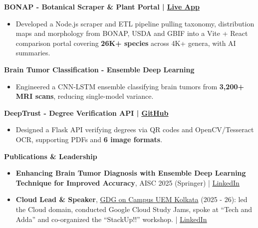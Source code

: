 \documentclass[10pt,a4paper]{article}
\newcommand{\heading}[1]{{\carlito #1}}
\newcommand{\cvsection}[1]{%
  \par\vspace{10pt}%
  {\heading{\color{sectioncolor}\large\bfseries #1}}\par\vspace{2pt}}
\newcommand{\cvsubsection}[1]{%
  \par\vspace{5pt}%
  {\heading{\color{subcolor}\bfseries #1}}\par}
\newenvironment{cvbullets}{\begin{itemize}\setlength{\parfillskip}{0pt}}{\end{itemize}}
\newcommand{\contactlink}[2]{\href{#1}{\color{sectioncolor}\underline{#2}}}
\begin{document}
\cvsubsection{BONAP - Botanical Scraper \& Plant Portal | \contactlink{https://bonap-frontend.onrender.com/}{Live App}}
\begin{cvbullets}
  \item Developed a Node.js scraper and ETL pipeline pulling taxonomy, distribution maps and morphology from BONAP, USDA
        and GBIF into a Vite + React comparison portal covering \textbf{26K+ species} across 4K+ genera, with AI summaries.
\end{cvbullets}

\cvsubsection{Brain Tumor Classification - Ensemble Deep Learning}
\begin{cvbullets}
  \item Engineered a CNN-LSTM ensemble classifying brain tumors from \textbf{3,200+ MRI scans}, reducing single-model variance.
\end{cvbullets}

\cvsubsection{DeepTrust - Degree Verification API | \contactlink{https://github.com/Soumika-11/deeptrust}{GitHub}}
\begin{cvbullets}
  \item Designed a Flask API verifying degrees via QR codes and OpenCV/Tesseract OCR, supporting PDFs and \textbf{6 image formats}.
\end{cvbullets}

\cvsection{Publications \& Leadership}
\begin{itemize}
  \item \textbf{Enhancing Brain Tumor Diagnosis with Ensemble Deep Learning Technique for Improved Accuracy},
        AISC 2025 (Springer) | \contactlink{https://www.linkedin.com/in/soumikadas/overlay/1768775586821/single-media-viewer/?profileId=ACoAADjotgUBcxQ5xZJAVK0yId5IZyYXuEPqmJo}{LinkedIn}
  \item \textbf{Cloud Lead \& Speaker},
        \href{https://gdg.community.dev/gdg-on-campus-university-of-engineering-management-kolkata-india/}{GDG on Campus UEM Kolkata}
        (2025 - 26): led the Cloud domain, conducted Google Cloud Study Jams, spoke at ``Tech and Adda''
        and co-organized the ``StackUp!!'' workshop. | \contactlink{https://www.linkedin.com/feed/update/urn:li:activity:7462911880844681216/}{LinkedIn}
\end{itemize}
\end{document}
